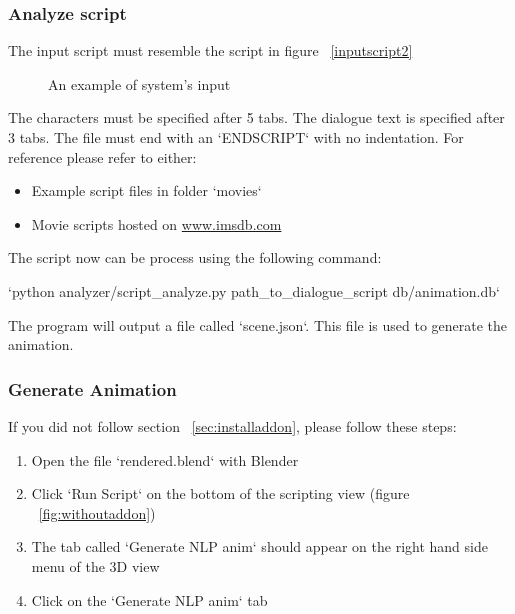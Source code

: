\subsubsection{Analyze script \label{sec:analyze-script}}
\noindent The input script must resemble the script in figure ~\ref{inputscript2}

\begin{figure}[!ht]
	\centerline{}
	\caption{An example of system's input}\label{fig:inputscript2}
\end{figure}

\noindent The characters must be specified after 5 tabs. The dialogue text is specified after 3 tabs. The file must end with an `ENDSCRIPT` with no indentation. For reference please refer to either:
\begin{itemize}
	\item Example script files in folder `movies`
	\item Movie scripts hosted on \url{www.imsdb.com}
\end{itemize}

\noindent The script now can be process using the following command:

\indent `python analyzer/script\_analyze.py path\_to\_dialogue\_script db/animation.db`

\noindent The program will output a file called `scene.json`. This file is used to generate the animation.

\subsubsection{Generate Animation}
\noindent If you did not follow section ~\ref{sec:installaddon}, please follow these steps:
\begin{enumerate}
	\item Open the file `rendered.blend` with Blender
	\item Click `Run Script` on the bottom of the scripting view (figure ~\ref{fig:withoutaddon})
	\item The tab called `Generate NLP anim` should appear on the right hand side menu of the 3D view
	\item Click on the `Generate NLP anim` tab
\end{enumerate}

